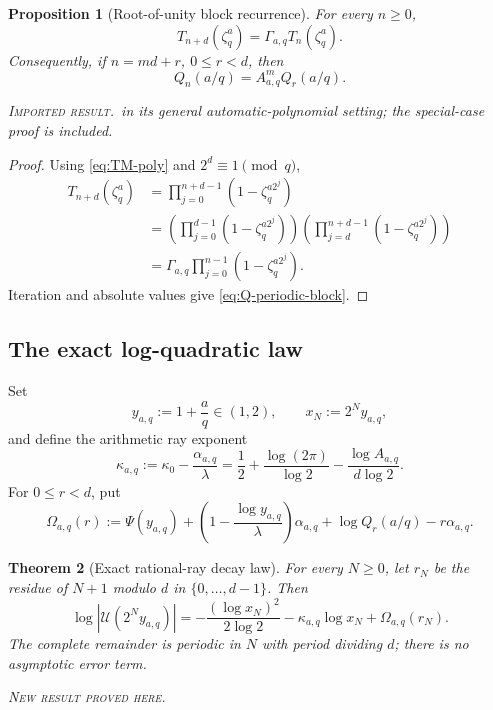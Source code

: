 \documentclass[11pt,oneside]{article}
\newtheorem{theorem}{Theorem}[section]
\newtheorem{proposition}[theorem]{Proposition}
\theoremstyle{definition}
\theoremstyle{remark}
\newcommand{\newresult}{\textcolor{newgreen}{\textsc{New result proved here.}}}
\newcommand{\imported}{\textcolor{importblue}{\textsc{Imported result.}}}
\begin{document}
\begin{proposition}[Root-of-unity block recurrence]\label{prop:root-recurrence}
For every $n\ge0$,
\begin{equation}
 T_{n+d}(\zeta_q^a)=\Gamma_{a,q}T_n(\zeta_q^a).
 \label{eq:root-recurrence}
\end{equation}
Consequently, if $n=md+r$, $0\le r<d$, then
\begin{equation}
 Q_n(a/q)=A_{a,q}^mQ_r(a/q).
 \label{eq:Q-periodic-block}
\end{equation}

\smallskip\noindent\imported\ in its general automatic-polynomial setting; the
special-case proof is included.
\end{proposition}

\begin{proof}
Using \eqref{eq:TM-poly} and $2^d\equiv1\pmod q$,
\begin{align*}
 T_{n+d}(\zeta_q^a)
 &=\prod_{j=0}^{n+d-1}(1-\zeta_q^{a2^j})\\
 &=\left(\prod_{j=0}^{d-1}(1-\zeta_q^{a2^j})\right)
   \left(\prod_{j=d}^{n+d-1}(1-\zeta_q^{a2^j})\right)\\
 &=\Gamma_{a,q}\prod_{j=0}^{n-1}(1-\zeta_q^{a2^j}).
\end{align*}
Iteration and absolute values give \eqref{eq:Q-periodic-block}.
\end{proof}

\subsection{The exact log-quadratic law}

Set
\begin{equation}
 y_{a,q}:=1+\frac aq\in(1,2),\qquad x_N:=2^Ny_{a,q},
 \label{eq:rational-ray}
\end{equation}
and define the arithmetic ray exponent
\begin{equation}
 \boxed{
 \kappa_{a,q}:=\kappa_0-\frac{\alpha_{a,q}}{\lambda}
 =\frac12+\frac{\log(2\pi)}{\log2}
 -\frac{\log A_{a,q}}{d\log2}.}
 \label{eq:kappa-aq}
\end{equation}
For $0\le r<d$, put
\begin{equation}
 \Omega_{a,q}(r):=\Psi(y_{a,q})
 +\left(1-\frac{\log y_{a,q}}{\lambda}\right)\alpha_{a,q}
 +\log Q_r(a/q)-r\alpha_{a,q}.
 \label{eq:Omega-def}
\end{equation}

\begin{theorem}[Exact rational-ray decay law]\label{thm:exact-rational-ray}
For every $N\ge0$, let $r_N$ be the residue of $N+1$ modulo $d$ in
$\{0,\ldots,d-1\}$. Then
\begin{equation}
 \boxed{
 \log|\mathscr U(2^Ny_{a,q})|
 =-\frac{(\log x_N)^2}{2\log2}
 -\kappa_{a,q}\log x_N+\Omega_{a,q}(r_N).}
 \label{eq:exact-ray-law}
\end{equation}
The complete remainder is periodic in $N$ with period dividing $d$; there is no
asymptotic error term.

\smallskip\noindent\newresult
\end{theorem}
\end{document}
